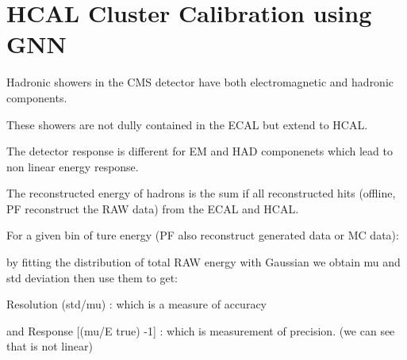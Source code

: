 




\section{HCAL Cluster Calibration using GNN}

Hadronic showers in the CMS detector have both electromagnetic and hadronic components.

These showers are not dully contained in the ECAL but extend to HCAL.

The detector response is different for EM and HAD componenets which lead to non linear energy response.

The reconstructed energy of hadrons is the sum if all reconstructed hits (offline, PF reconstruct the RAW data) from the ECAL and HCAL.

For a given bin of ture energy (PF also reconstruct generated data or MC data):

by fitting the distribution of total RAW energy with Gaussian we obtain mu and std deviation then use them to get:

Resolution (std/mu) : which is a measure of accuracy

and Response [(mu/E true) -1] : which is measurement of precision. (we can see that is not linear)

